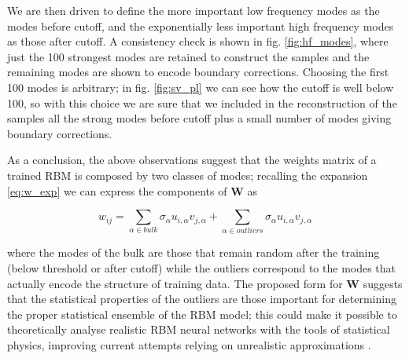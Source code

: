 \documentclass[notitlepage]{revtex4-1}
\begin{document}
We are then driven to define the more important low frequency modes as the modes before cutoff, and the exponentially less important high frequency modes as those after cutoff. A consistency check is shown in fig. \ref{fig:hf_modes}, where just the 100 strongest modes are retained to construct the samples and the remaining modes are shown to encode boundary corrections. Choosing the first 100 modes is arbitrary; in fig. \ref{fig:sv_pl} we can see how the cutoff is well below 100, so with this choice we are sure that we included in the reconstruction of the samples all the strong modes before cutoff plus a small number of modes giving boundary corrections.

As a conclusion, the above observations suggest that the weights matrix of a trained RBM is composed by two classes of modes; recalling the expansion \eqref{eq:w_exp} we can express the components of \(\mathbf{W}\) as

\begin{equation}
w_{ij} = \sum_{\alpha \in bulk} \sigma_{\alpha} u_{i,\alpha} v_{j,\alpha} + \sum_{\alpha \in outliers} \sigma_{\alpha} u_{i,\alpha} v_{j,\alpha}
\label{eq:params_exp}
\end{equation}

where the modes of the bulk are those that remain random after the training (below threshold or after cutoff) while the outliers correspond to the modes that actually encode the structure of training data. The proposed form for \(\mathbf{W}\) suggests that the statistical properties of the outliers are those important for determining the proper statistical ensemble of the RBM model; this could make it possible to theoretically analyse realistic RBM neural networks with the tools of statistical physics, improving current attempts relying on unrealistic approximations \cite{monasson}.
\end{document}
